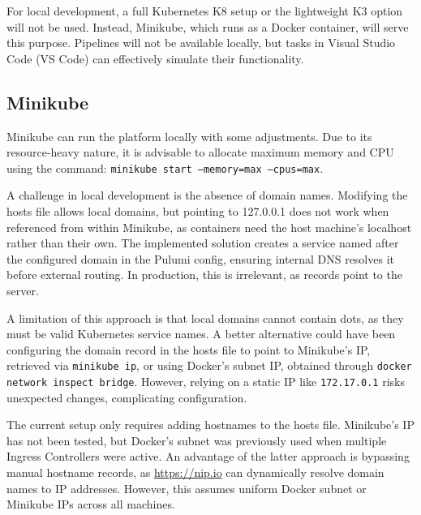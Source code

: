 For local development, a full Kubernetes K8 setup or the lightweight K3 option will not be used. Instead, Minikube, which runs as a Docker container, will serve this purpose. Pipelines will not be available locally, but tasks in Visual Studio Code (VS Code) can effectively simulate their functionality.

\subsection{Minikube}
Minikube can run the platform locally with some adjustments. Due to its resource-heavy nature, it is advisable to allocate maximum memory and CPU using the command: \texttt{minikube start --memory=max --cpus=max}.

A challenge in local development is the absence of domain names. Modifying the hosts file allows local domains, but pointing to 127.0.0.1 does not work when referenced from within Minikube, as containers need the host machine's localhost rather than their own. The implemented solution creates a service named after the configured domain in the Pulumi config, ensuring internal DNS resolves it before external routing. In production, this is irrelevant, as records point to the server.

A limitation of this approach is that local domains cannot contain dots, as they must be valid Kubernetes service names. A better alternative could have been configuring the domain record in the hosts file to point to Minikube's IP, retrieved via \texttt{minikube ip}, or using Docker's subnet IP, obtained through \texttt{docker network inspect bridge}. However, relying on a static IP like \texttt{172.17.0.1} risks unexpected changes, complicating configuration.

The current setup only requires adding hostnames to the hosts file. Minikube's IP has not been tested, but Docker's subnet was previously used when multiple Ingress Controllers were active. An advantage of the latter approach is bypassing manual hostname records, as \url{https://nip.io} can dynamically resolve domain names to IP addresses. However, this assumes uniform Docker subnet or Minikube IPs across all machines.

